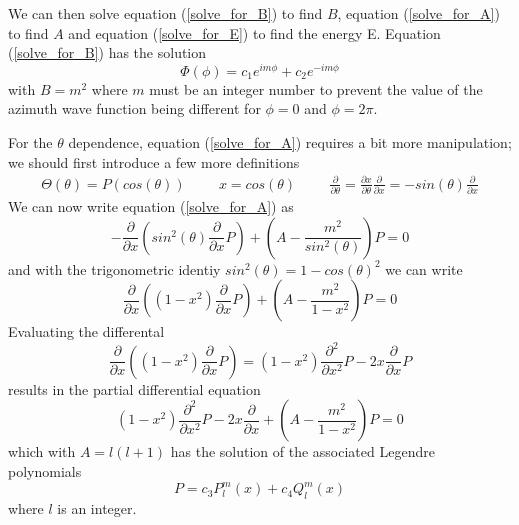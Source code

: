 \documentclass[12pt,a4paper]{report}
\begin{document}
	We can then solve equation (\ref{solve_for_B}) to find $B$, equation (\ref{solve_for_A}) to find $A$ and equation (\ref{solve_for_E}) to find the energy E. Equation (\ref{solve_for_B}) has the solution
	\begin{equation}
		\Phi\left(\phi\right) = c_1 e^{im\phi}+c_2 e^{-im\phi}
	\end{equation}
	with $B=m^2$ where $m$ must be an integer number to prevent the value of the azimuth wave function being different for $\phi = 0$ and $\phi = 2\pi$. 

	For the $\theta$ dependence, equation (\ref{solve_for_A}) requires a bit more manipulation; we should first introduce a few more definitions
	\begin{align}
		\Theta\left(\theta\right) = P\left(cos\left(\theta\right)\right) \hspace{1cm} x=cos\left(\theta\right) \hspace{1cm} \frac{\partial}{\partial\theta} = \frac{\partial x}{\partial\theta}\frac{\partial}{\partial x} = -sin\left(\theta\right)\frac{\partial}{\partial x}
	\end{align}
	We can now write equation (\ref{solve_for_A}) as
	\begin{equation}
		-\frac{\partial}{\partial x}\left(sin^2\left(\theta\right)\frac{\partial}{\partial x}P\right)+\left(A-\frac{m^2}{sin^2\left(\theta\right)}\right)P=0
	\end{equation}
	and with the trigonometric identiy $sin^2\left(\theta\right)= 1-cos\left(\theta\right)^2$ we can write
	\begin{equation}
		\frac{\partial}{\partial x}\left(\left(1-x^2\right)\frac{\partial}{\partial x}P\right)+\left(A-\frac{m^2}{1-x^2}\right)P=0
	\end{equation}
	Evaluating the differental 
	\begin{equation}
		\frac{\partial}{\partial x}\left(\left(1-x^2\right)\frac{\partial}{\partial x}P\right) = \left(1-x^2\right)\frac{\partial^2}{\partial x^2}P-2x\frac{\partial}{\partial x}P
	\end{equation}
	results in the partial differential equation
	\begin{equation}
		\left(1-x^2\right)\frac{\partial^2}{\partial x^2}P-2x\frac{\partial}{\partial x}+ \left(A-\frac{m^2}{1-x^2}\right)P=0
	\end{equation}
	which with $A=l\left(l+1\right)$ has the solution of the associated Legendre polynomials \cite{Abramowitz and Stegun 124}
	\begin{equation}
		P=c_3 P^m_l\left(x\right)+c_4 Q^m_l\left(x\right)
	\end{equation}
	where $l$ is an integer.
\end{document}
